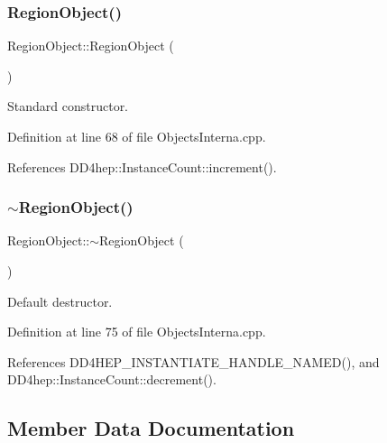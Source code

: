 \subsubsection{\texorpdfstring{Region\+Object()}{RegionObject()}}
{\footnotesize\ttfamily Region\+Object\+::\+Region\+Object (\begin{DoxyParamCaption}{ }\end{DoxyParamCaption})}



Standard constructor. 



Definition at line 68 of file Objects\+Interna.\+cpp.



References D\+D4hep\+::\+Instance\+Count\+::increment().

\hypertarget{class_d_d4hep_1_1_geometry_1_1_region_object_a254eb8e472a5d43755b32b0f09be6023}{}\label{class_d_d4hep_1_1_geometry_1_1_region_object_a254eb8e472a5d43755b32b0f09be6023} 
\subsubsection{\texorpdfstring{$\sim$\+Region\+Object()}{~RegionObject()}}
{\footnotesize\ttfamily Region\+Object\+::$\sim$\+Region\+Object (\begin{DoxyParamCaption}{ }\end{DoxyParamCaption})\hspace{0.3cm}{\ttfamily [virtual]}}



Default destructor. 



Definition at line 75 of file Objects\+Interna.\+cpp.



References D\+D4\+H\+E\+P\+\_\+\+I\+N\+S\+T\+A\+N\+T\+I\+A\+T\+E\+\_\+\+H\+A\+N\+D\+L\+E\+\_\+\+N\+A\+M\+E\+D(), and D\+D4hep\+::\+Instance\+Count\+::decrement().



\subsection{Member Data Documentation}
\hypertarget{class_d_d4hep_1_1_geometry_1_1_region_object_a6f1d69c54ce278aea8af3fbad679b0d3}{}\label{class_d_d4hep_1_1_geometry_1_1_region_object_a6f1d69c54ce278aea8af3fbad679b0d3} 
